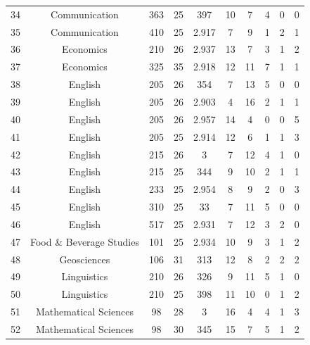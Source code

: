 \documentclass[12pt,letterpaper,oneside,openany]{book}
\begin{document}
\begin{center}
\begin{longtable}{c||ccccccccc}
34 & Communication                   & 363   & 25                & 397 & 10 & 7  & 4 & 0 & 0 \\
35 & Communication                   & 410   & 25                & 2.917 & 7  & 9  & 1 & 2 & 1 \\
36 & Economics                       & 210   & 26                & 2.937 & 13 & 7  & 3 & 1 & 2 \\
37 & Economics                       & 325   & 35                & 2.918 & 12 & 11 & 7 & 1 & 1 \\
38 & English                         & 205   & 26                & 354 & 7  & 13 & 5 & 0 & 0 \\
39 & English                         & 205   & 26                & 2.903 & 4  & 16 & 2 & 1 & 1 \\
40 & English                         & 205   & 26                & 2.957 & 14 & 4  & 0 & 0 & 5 \\
41 & English                         & 205   & 25                & 2.914 & 12 & 6  & 1 & 1 & 3 \\
42 & English                         & 215   & 26                & 3   & 7  & 12 & 4 & 1 & 0 \\
43 & English                         & 215   & 25                & 344 & 9  & 10 & 2 & 1 & 1 \\
44 & English                         & 233   & 25                & 2.954 & 8  & 9  & 2 & 0 & 3 \\
45 & English                         & 310   & 25                & 33  & 7  & 11 & 5 & 0 & 0 \\
46 & English                         & 517   & 25                & 2.931 & 7  & 12 & 3 & 2 & 0 \\
47 & Food \& Beverage Studies        & 101   & 25                & 2.934 & 10 & 9  & 3 & 1 & 2 \\
48 & Geosciences                     & 106   & 31                & 313 & 12 & 8  & 2 & 2 & 2 \\
49 & Linguistics                     & 210   & 26                & 326 & 9  & 11 & 5 & 1 & 0 \\
50 & Linguistics                     & 210   & 25                & 398 & 11 & 10 & 0 & 1 & 2 \\
51 & Mathematical Sciences           & 98    & 28                & 3   & 16 & 4  & 4 & 1 & 3 \\
52 & Mathematical Sciences           & 98    & 30                & 345 & 15 & 7  & 5 & 1 & 2 \\

\end{longtable}
\end{center}
\end{document}
